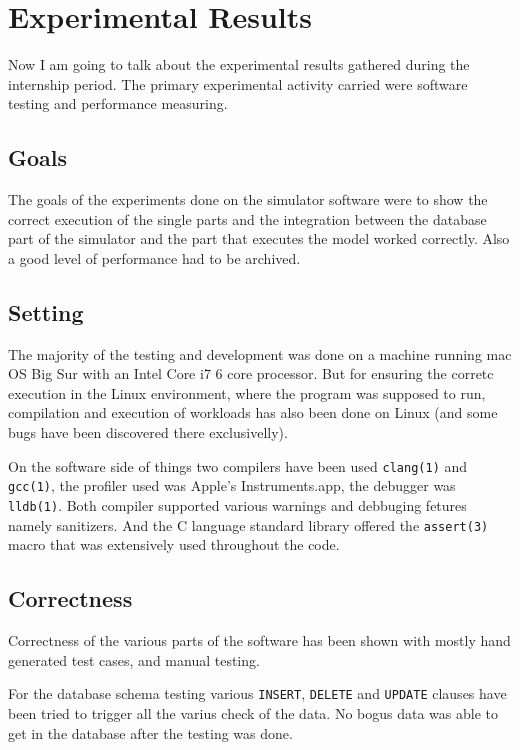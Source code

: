 \documentclass[Lau]{sapthesis} %
\begin{document}
\section{Experimental Results}%

Now I am going to talk about the experimental results gathered during the
internship period. The primary experimental activity carried were software
testing and performance measuring.

\subsection{Goals}

The goals of the experiments done on the simulator software were to show the
correct execution of the single parts and the integration between the
database part of the simulator and the part that executes the model worked
correctly. Also a good level of performance had to be archived.

\subsection{Setting}

The majority of the testing and development was done on a machine running mac OS
Big Sur with an Intel Core i7 6 core processor. But for ensuring the corretc
execution in the Linux environment, where the program was supposed to run,
compilation and execution of workloads has also been done on Linux (and some
bugs have been discovered there exclusivelly).

On the software side of things two compilers have been used \texttt{clang(1)}
and \texttt{gcc(1)}, the profiler used was Apple's Instruments.app, the debugger
was \texttt{lldb(1)}. Both compiler supported various warnings and debbuging
fetures namely sanitizers. And the C language standard library offered the
\texttt{assert(3)} macro that was extensively used throughout the code.

\subsection{Correctness}

Correctness of the various parts of the software has been shown with mostly hand
generated test cases, and manual testing.

For the database schema testing various \texttt{INSERT}, \texttt{DELETE} and
\texttt{UPDATE} clauses have been tried to trigger all the varius check of the
data. No bogus data was able to get in the database after the testing was done.
\end{document}
